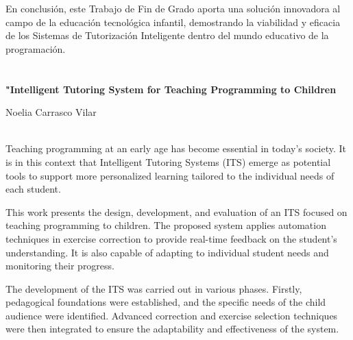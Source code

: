 En conclusión, este Trabajo de Fin de Grado aporta una solución innovadora al campo de la educación tecnológica infantil, demostrando la viabilidad y eficacia de los Sistemas de Tutorización Inteligente dentro del mundo educativo de la programación.



\chapter*{}
\thispagestyle{empty}

\begin{center}

{\large\bfseries "Intelligent Tutoring System for Teaching Programming to Children}\\[1cm]

\end{center}

\begin{center}

Noelia Carrasco Vilar\\

\end{center}

\vspace{0.5cm}
\vspace{0.5cm}

\\

Teaching programming at an early age has become essential in today's society. It is in this context that Intelligent Tutoring Systems (ITS) emerge as potential tools to support more personalized learning tailored to the individual needs of each student.

This work presents the design, development, and evaluation of an ITS focused on teaching programming to children. The proposed system applies automation techniques in exercise correction to provide real-time feedback on the student's understanding. It is also capable of adapting to individual student needs and monitoring their progress.

The development of the ITS was carried out in various phases. Firstly, pedagogical foundations were established, and the specific needs of the child audience were identified. Advanced correction and exercise selection techniques were then integrated to ensure the adaptability and effectiveness of the system.

